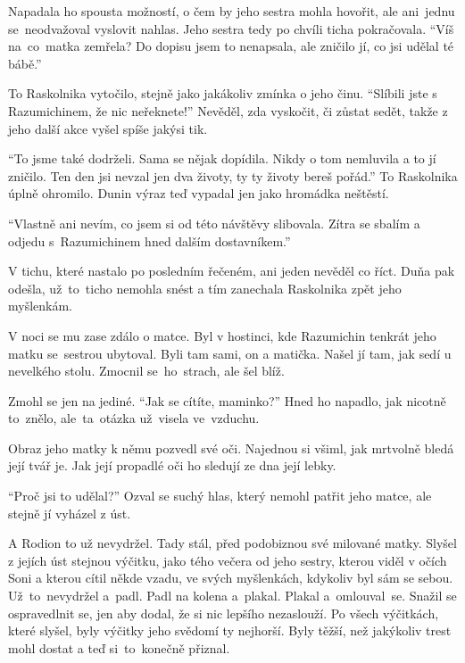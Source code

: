 \documentclass[11pt]{article}
\begin{document}
Napadala ho spousta možností, o čem by jeho sestra mohla hovořit, ale ani~jednu se~neodvažoval vyslovit nahlas. Jeho sestra tedy po chvíli ticha pokračovala. \enquote{Víš na~co~matka zemřela? Do dopisu jsem to nenapsala, ale zničilo jí, co jsi udělal té bábě.}

To Raskolnika vytočilo, stejně jako jakákoliv zmínka o jeho činu. \enquote{Slíbili jste s Razumichinem, že nic neřeknete!} Nevěděl, zda vyskočit, či zůstat sedět, takže z jeho další akce vyšel spíše jakýsi tik.

\enquote{To jsme také dodrželi. Sama se nějak dopídila. Nikdy o tom nemluvila a to jí zničilo. Ten den jsi nevzal jen dva životy, ty ty životy bereš pořád.} To Raskolnika úplně ohromilo. Dunin výraz teď vypadal jen jako hromádka neštěstí.

\enquote{Vlastně ani nevím, co jsem si od této návštěvy slibovala. Zítra se sbalím a odjedu s~Razumichinem hned dalším dostavníkem.}

V tichu, které nastalo po posledním řečeném, ani jeden nevěděl co říct. Duňa pak odešla, už~to~ticho nemohla snést a tím zanechala Raskolnika zpět jeho myšlenkám.

\hspace{1em}

V noci se mu zase zdálo o matce. Byl v hostinci, kde Razumichin tenkrát jeho matku se~sestrou ubytoval. Byli tam sami, on a matička. Našel jí tam, jak sedí u nevelkého stolu. Zmocnil se~ho~strach, ale šel blíž.

Zmohl se jen na jediné. \enquote{Jak se cítíte, maminko?} Hned ho napadlo, jak nicotně to~znělo, ale~ta~otázka už~visela ve~vzduchu.

Obraz jeho matky k němu pozvedl své oči. Najednou si všiml, jak mrtvolně bledá její tvář je. Jak její propadlé oči ho sledují ze dna její lebky.

\enquote{Proč jsi to udělal?} Ozval se suchý hlas, který nemohl patřit jeho matce, ale stejně jí vyházel z úst.

A Rodion to už nevydržel. Tady stál, před podobiznou své milované matky. Slyšel z jejích úst stejnou výčitku, jako tého večera od jeho sestry, kterou viděl v očích Soni a kterou cítil někde vzadu, ve svých myšlenkách, kdykoliv byl sám se sebou. Už~to~nevydržel a~padl. Padl na kolena a~plakal. Plakal a~omlouval~se. Snažil se ospravedlnit se, jen aby dodal, že si nic lepšího nezaslouží. Po všech výčitkách, které slyšel, byly výčitky jeho svědomí ty nejhorší. Byly těžší, než jakýkoliv trest mohl dostat a teď si~to~konečně přiznal.
\end{document}
